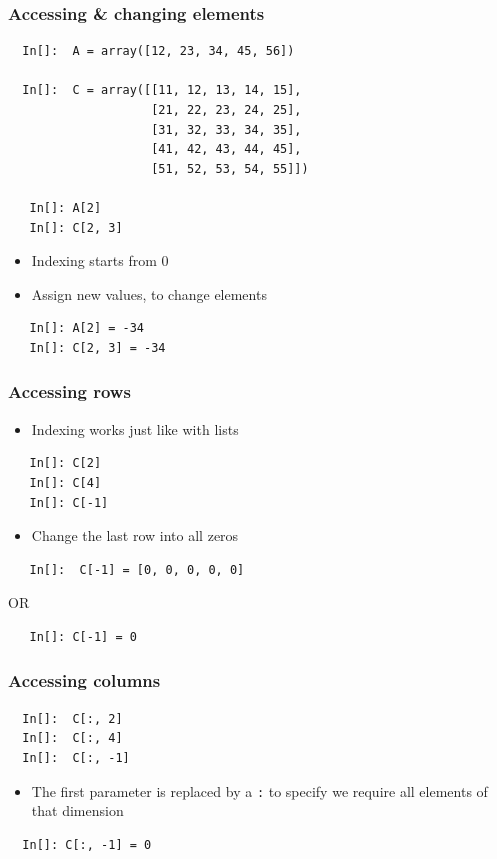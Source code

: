 \begin{frame}[fragile]
  \frametitle{Accessing \& changing elements}
  \begin{lstlisting}
  In[]:  A = array([12, 23, 34, 45, 56])

  In[]:  C = array([[11, 12, 13, 14, 15],
                    [21, 22, 23, 24, 25],
                    [31, 32, 33, 34, 35],
                    [41, 42, 43, 44, 45],
                    [51, 52, 53, 54, 55]])

   In[]: A[2]
   In[]: C[2, 3]
  \end{lstlisting}
  \begin{itemize}
  \item Indexing starts from 0
  \item Assign new values, to change elements
  \end{itemize}
  \begin{lstlisting}
   In[]: A[2] = -34
   In[]: C[2, 3] = -34
  \end{lstlisting}
\end{frame}

\begin{frame}[fragile]
  \frametitle{Accessing rows}
  \begin{itemize}
  \item Indexing works just like with lists
  \end{itemize}
  \begin{lstlisting}
   In[]: C[2]
   In[]: C[4]
   In[]: C[-1]
  \end{lstlisting}
  \begin{itemize}
  \item Change the last row into all zeros
  \end{itemize}
  \begin{lstlisting}
   In[]:  C[-1] = [0, 0, 0, 0, 0]
  \end{lstlisting}
  OR
  \begin{lstlisting}
   In[]: C[-1] = 0
  \end{lstlisting}
\end{frame}

\begin{frame}[fragile]
  \frametitle{Accessing columns}
  \begin{lstlisting}
  In[]:  C[:, 2]
  In[]:  C[:, 4]
  In[]:  C[:, -1]
  \end{lstlisting}
  \begin{itemize}
  \item The first parameter is replaced by a \texttt{:} to specify we
    require all elements of that dimension
  \end{itemize}
  \begin{lstlisting}
  In[]: C[:, -1] = 0
  \end{lstlisting}
\end{frame}

